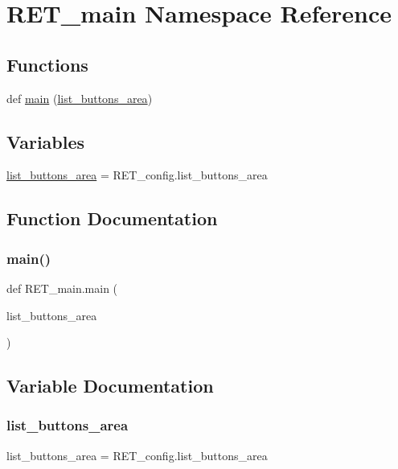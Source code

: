\hypertarget{namespaceRET__main}{}\section{R\+E\+T\+\_\+main Namespace Reference}
\label{namespaceRET__main}
\subsection*{Functions}
\begin{DoxyCompactItemize}
\item 
def \hyperlink{namespaceRET__main_aa865772e295c54935897bbf98cad85d8}{main} (\hyperlink{namespaceRET__main_ac4848af5696d2d98e426d3d775d6964d}{list\+\_\+buttons\+\_\+area})
\end{DoxyCompactItemize}
\subsection*{Variables}
\begin{DoxyCompactItemize}
\item 
\hyperlink{namespaceRET__main_ac4848af5696d2d98e426d3d775d6964d}{list\+\_\+buttons\+\_\+area} = R\+E\+T\+\_\+config.\+list\+\_\+buttons\+\_\+area
\end{DoxyCompactItemize}


\subsection{Function Documentation}
\mbox{\label{namespaceRET__main_aa865772e295c54935897bbf98cad85d8}} 
\subsubsection{\texorpdfstring{main()}{main()}}
{\footnotesize\ttfamily def R\+E\+T\+\_\+main.\+main (\begin{DoxyParamCaption}\item[{}]{list\+\_\+buttons\+\_\+area }\end{DoxyParamCaption})}



\subsection{Variable Documentation}
\mbox{\label{namespaceRET__main_ac4848af5696d2d98e426d3d775d6964d}} 
\subsubsection{\texorpdfstring{list\+\_\+buttons\+\_\+area}{list\_buttons\_area}}
{\footnotesize\ttfamily list\+\_\+buttons\+\_\+area = R\+E\+T\+\_\+config.\+list\+\_\+buttons\+\_\+area}

